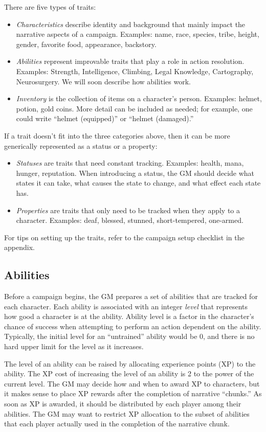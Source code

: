 There are five types of traits:
\begin{itemize}
\item
\emph{Characteristics} describe identity and background that mainly impact the narrative aspects of a campaign.
Examples: name, race, species, tribe, height, gender, favorite food, appearance, backstory.
\item
\emph{Abilities} represent improvable traits that play a role in action resolution.
Examples: Strength, Intelligence, Climbing, Legal Knowledge, Cartography, Neurosurgery.
We will soon describe how abilities work.
\item
\emph{Inventory} is the collection of items on a character's person.
Examples: helmet, potion, gold coins.
More detail can be included as needed; for example, one could write ``helmet (equipped)'' or ``helmet (damaged).''
\end{itemize}
If a trait doesn’t fit into the three categories above, then it can be more generically represented as a status or a property:
\begin{itemize}
\item
\emph{Statuses} are traits that need constant tracking.
Examples: health, mana, hunger, reputation.
When introducing a status, the GM should decide what states it can take, what causes the state to change, and what effect each state has.
\item
\emph{Properties} are traits that only need to be tracked when they apply to a character.
Examples: deaf, blessed, stunned, short-tempered, one-armed.
\end{itemize}

For tips on setting up the traits, refer to the campaign setup checklist in the appendix.

\subsection{Abilities}
\label{sec:abilities}
Before a campaign begins, the GM prepares a set of abilities that are tracked for each character.
Each ability is associated with an integer \emph{level} that represents how good a character is at the ability.
Ability level is a factor in the character's chance of success when attempting to perform an action dependent on the ability.
Typically, the initial level for an ``untrained'' ability would be $0$, and there is no hard upper limit for the level as it increases.

The level of an ability can be raised by allocating experience points (XP) to the ability.
The XP cost of increasing the level of an ability is 2 to the power of the current level.
The GM may decide how and when to award XP to characters, but it makes sense to place XP rewards after the completion of narrative ``chunks.''
As soon as XP is awarded, it should be distributed by each player among their abilities.
The GM may want to restrict XP allocation to the subset of abilities that each player actually used in the completion of the narrative chunk.

